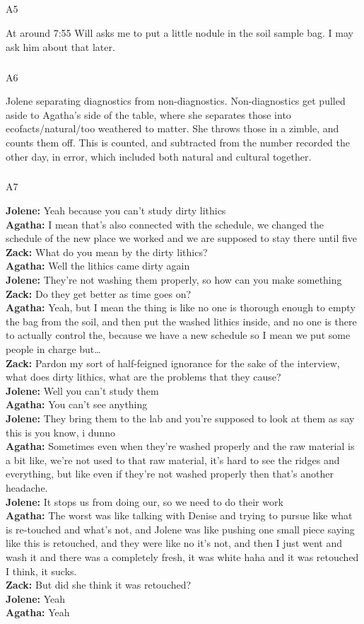 \documentclass[
  canadian,
]{article}
\makeatletter
\let\oldsubparagraph\subparagraph
\renewcommand{\subparagraph}{
    \@ifstar
      \xxxSubParagraphStar
      \xxxSubParagraphNoStar
  }
\newcommand{\xxxSubParagraphStar}[1]{\oldsubparagraph*{#1}\mbox{}}
\newcommand{\xxxSubParagraphNoStar}[1]{\oldsubparagraph{#1}\mbox{}}
\makeatother
\begin{document}
\subparagraph{A5}\label{sec-A5}

At around 7:55 Will asks me to put a little nodule in the soil sample
bag. I may ask him about that later.

\subparagraph{A6}\label{sec-A6}

Jolene separating diagnostics from non-diagnostics. Non-diagnostics get
pulled aside to Agatha's side of the table, where she separates those
into ecofacts/natural/too weathered to matter. She throws those in a
zimble, and counts them off. This is counted, and subtracted from the
number recorded the other day, in error, which included both natural and
cultural together.

\subparagraph{A7}\label{sec-A7}

\textbf{Jolene:} Yeah because you can't study dirty lithics\\
\textbf{Agatha:} I mean that's also connected with the schedule, we
changed the schedule of the new place we worked and we are supposed to
stay there until five\\
\textbf{Zack:} What do you mean by the dirty lithics?\\
\textbf{Agatha:} Well the lithics came dirty again\\
\textbf{Jolene:} They're not washing them properly, so how can you make
something\\
\textbf{Zack:} Do they get better as time goes on?\\
\textbf{Agatha:} Yeah, but I mean the thing is like no one is thorough
enough to empty the bag from the soil, and then put the washed lithics
inside, and no one is there to actually control the, because we have a
new schedule so I mean we put some people in charge but\ldots{}\\
\textbf{Zack:} Pardon my sort of half-feigned ignorance for the sake of
the interview, what does dirty lithics, what are the problems that they
cause?\\
\textbf{Jolene:} Well you can't study them\\
\textbf{Agatha:} You can't see anything\\
\textbf{Jolene:} They bring them to the lab and you're supposed to look
at them as say this is you know, i dunno\\
\textbf{Agatha:} Sometimes even when they're washed properly and the raw
material is a bit like, we're not used to that raw material, it's hard
to see the ridges and everything, but like even if they're not washed
properly then that's another headache.\\
\textbf{Jolene:} It stops us from doing our, so we need to do their
work\\
\textbf{Agatha:} The worst was like talking with Denise and trying to
pursue like what is re-touched and what's not, and Jolene was like
pushing one small piece saying like this is retouched, and they were
like no it's not, and then I just went and wash it and there was a
completely fresh, it was white haha and it was retouched I think, it
sucks.\\
\textbf{Zack:} But did she think it was retouched?\\
\textbf{Jolene:} Yeah\\
\textbf{Agatha:} Yeah
\end{document}
